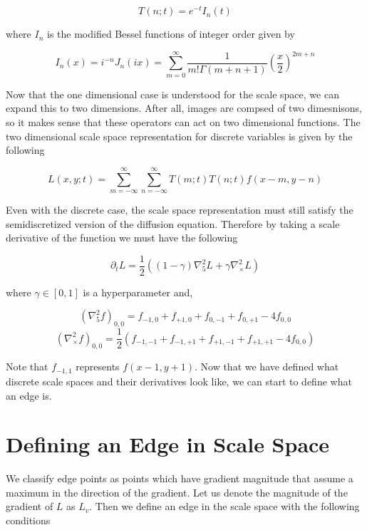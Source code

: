 \documentclass{article}
\begin{document}
\begin{equation}
  T(n;t) = e^{-t}I_n(t)
\end{equation}

where $I_n$ is the modified Bessel functions of integer order given by

\begin{equation}
  I_n(x) = i^{-n}J_{n}(ix) = \sum_{m=0}^{\infty}\frac{1}{m!\Gamma(m+n+1)}\left(\frac{x}{2}\right)^{2m+n}
\end{equation}

Now that the one dimensional case is understood for the scale space, we can expand this to two dimensions.
After all, images are compsed of two dimesnisons, so it makes sense that these operators can act on two dimensional functions.
The two dimensional scale space representation for discrete variables is given by the following

\begin{equation}
  L(x,y;t) = \sum_{m=-\infty}^{\infty}\sum_{n=-\infty}^{\infty}T(m;t)T(n;t)f(x-m,y-n)
\end{equation}

Even with the discrete case, the scale space representation must still satisfy the semidiscretized version of the diffusion equation.
Therefore by taking a scale derivative of the function we must have the following

\begin{equation}
  \partial_t L = \frac{1}{2}((1-\gamma)\nabla^2_5L+\gamma\nabla^2_\times L)
\end{equation}

where $\gamma \in [0,1]$ is a hyperparameter and,

\begin{equation}
  (\nabla^2_5f)_{0,0} = f_{-1,0} + f_{+1,0} + f_{0,-1} + f_{0,+1} - 4f_{0,0}
\end{equation}
\begin{equation}
  (\nabla^2_\times f)_{0,0} = \frac{1}{2}(f_{-1,-1} + f_{-1,+1} + f_{+1,-1} + f_{+1,+1} - 4f_{0,0})
\end{equation}

Note that $f_{-1,1}$ represents $f(x-1, y+1)$. Now that we have defined what discrete scale spaces and their derivatives look like, we can start to define what an edge is.

\section{Defining an Edge in Scale Space}
We classify edge points as points which have gradient magnitude that assume a maximum in the direction of the gradient. Let us denote the magnitude of the gradient of $L$ as $L_v$. Then we define an edge in the scale space with the following conditions
\end{document}
